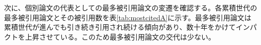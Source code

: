 次に、個別論文の代表としての最多被引用論文の変遷を確認する。各累積世代の最多被引用論文とその被引用数を表\ref{tab:mostcitedA}に示す。最多被引用論文は累積世代が進んでも引き続き引用され続ける傾向があり、数十年をかけてインパクトを上昇させている。このため最多被引用論文の交代は少ない。
